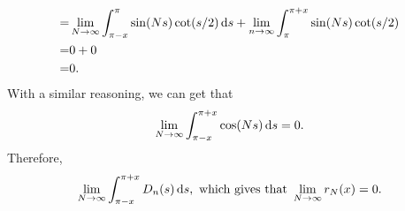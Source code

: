 \documentclass[12pt]{article}
\begin{document}
\begin{fproof}[4(a)]
\begin{align*}
   =&\lim_{N\to \infty} \int_{\pi-x}^{\pi} \sin(Ns) \cot(s/2) \mathop{}\!\mathrm{d} s + \lim_{n\to \infty} \int_{\pi}^{\pi+x} \sin(Ns) \cot(s/2) \\
   =& 0 +0\\
   =& 0.
 \end{align*}
 With a similar reasoning, we can get that
 \begin{align*}
   \lim_{N \to \infty}\int_{\pi - x}^{\pi+x} \cos(Ns) \mathop{}\!\mathrm{d} s = 0.
 \end{align*}
 Therefore,
 \begin{align*}
   \lim_{N\to\infty} \int_{\pi - x}^{\pi+x} D_n(s) \mathop{}\!\mathrm{d} s, \text{ which gives that } \lim_{N \to \infty} r_N(x) = 0.
 \end{align*}
\end{fproof}

\begin{fproof}[4(b)]
 
\end{fproof}

\begin{fproof}[4(c)]
 
\end{fproof}
\end{document}
